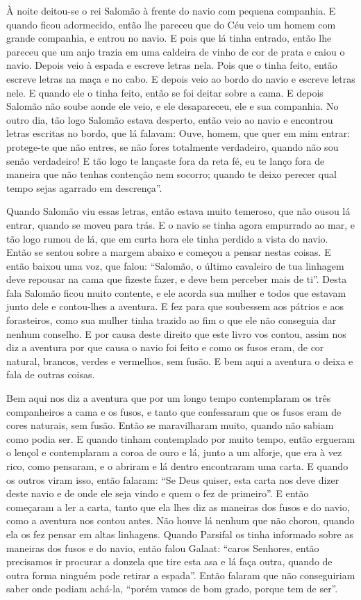 À noite deitou-se o rei Salomão à frente do navio com pequena companhia. E
quando ficou adormecido, então lhe pareceu que do Céu veio um homem com grande
companhia, e entrou no navio. E pois que lá tinha entrado, então lhe pareceu
que um anjo trazia em  uma caldeira de vinho de cor de prata e caiou o navio.
Depois veio à espada e escreve letras nela. Pois que o tinha feito, então
escreve letras na maça e no cabo. E depois veio ao bordo do navio e escreve
letras nele. E quando ele o tinha feito, então se foi deitar sobre a cama. E
depois Salomão não soube aonde ele veio, e ele desapareceu, ele e sua companhia. 
No outro dia, tão logo Salomão estava desperto, então veio ao navio e
encontrou letras escritas no bordo, que lá falavam: Ouve, homem, que quer em
mim entrar: protege-te que não entres, se não fores totalmente verdadeiro,
quando não sou senão verdadeiro! E tão logo te lançaste fora da reta fé, eu te
lanço fora de maneira que não tenhas contenção nem socorro; quando te deixo
perecer qual tempo sejas agarrado em descrença”.

Quando Salomão viu essas letras, então estava muito temeroso, que não ousou lá
entrar, quando se moveu para trás. E o navio se tinha agora empurrado ao mar, e
tão logo rumou de lá, que em curta hora ele tinha perdido a vista do navio.
Então se sentou sobre a margem abaixo e começou a pensar nestas coisas. E então
baixou uma voz, que falou: “Salomão, o último cavaleiro de tua linhagem deve
repousar na cama que fizeste fazer, e deve bem perceber mais de ti”.
Desta fala Salomão ficou muito contente, e ele acorda sua mulher e todos que
estavam junto dele e contou-lhes a aventura. E fez para que soubessem aos
pátrios e aos forasteiros, como sua mulher tinha trazido ao fim o que ele não
conseguia dar nenhum conselho. E por causa deste direito que este livro vos
contou, assim nos diz a aventura por que causa o navio foi feito e como os
fusos eram, de cor natural, brancos, verdes e vermelhos, sem fusão. E bem aqui
a aventura o deixa e fala de outras coisas.

Bem aqui nos diz a aventura que por um longo tempo contemplaram os três
companheiros a cama e os fusos, e tanto que confessaram que os fusos eram de
cores naturais, sem fusão. Então se maravilharam muito, quando não sabiam como
podia ser. E quando tinham contemplado por muito tempo, então ergueram o lençol
e contemplaram a coroa de ouro e lá, junto a um alforje, que era à vez rico,
como pensaram, e o abriram e lá dentro encontraram uma carta. E quando os
outros viram isso, então falaram: “Se Deus quiser, esta carta nos deve dizer
deste navio e de onde ele seja vindo e quem o fez de primeiro”. E então
começaram a ler a carta, tanto que ela lhes diz as maneiras dos fusos e do
navio, como a aventura nos contou antes. Não houve lá nenhum que não chorou,
quando ela os fez pensar em altas linhagens. Quando Parsifal os tinha
informado sobre as maneiras dos fusos e do navio, então falou Galaat: “caros
Senhores, então precisamos ir procurar a donzela que tire esta asa e lá faça
outra, quando de outra forma ninguém pode retirar a espada”. Então falaram que
não conseguiriam saber onde podiam achá-la, “porém vamos de bom grado, porque
tem de ser”.

